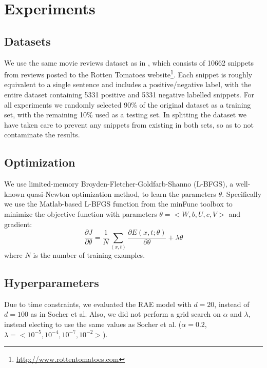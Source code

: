 \documentclass{article}
\begin{document}
\section{Experiments}

%
%
\subsection{Datasets}
We use the same movie reviews dataset as in \cite{Socher}, which consists of 10662 snippets from reviews posted to the Rotten Tomatoes website\footnote{\url{http://www.rottentomatoes.com}}. Each snippet is roughly equivalent to a single sentence and includes a positive/negative label, with the entire dataset containing 5331 positive and 5331 negative labelled snippets. For all experiments we randomly selected 90\% of the original dataset as a training set, with the remaining 10\% used as a testing set. In splitting the dataset we have taken care to prevent any snippets from existing in both sets, so as to not contaminate the results.


%
%
\subsection{Optimization}
We use limited-memory Broyden-Fletcher-Goldfarb-Shanno (L-BFGS), a well-known quasi-Newton optimization method, to learn the parameters $\theta$. Specifically we use the Matlab-based L-BFGS function from the minFunc toolbox \cite{minFunc} to minimize the objective function with parameters $\theta = < W, b, U, c, V>$ and gradient:
\begin{equation}
    \frac{\partial J}{\partial \theta} = \frac{1}{N} \sum_{(x, t)} \frac{\partial E(x, t; \theta)}{\partial \theta} + \lambda \theta
\end{equation}
where $N$ is the number of training examples.


%
%
\subsection{Hyperparameters}
Due to time constraints, we evaluated the RAE model with $d=20$, instead of $d=100$ as in Socher et al. Also, we did not perform a grid search on $\alpha$ and $\lambda$, instead electing to use the same values as Socher et al. ($\alpha = 0.2$, $\lambda = <10^{-5}, 10^{-4}, 10^{-7}, 10^{-2}>$).
\end{document}
